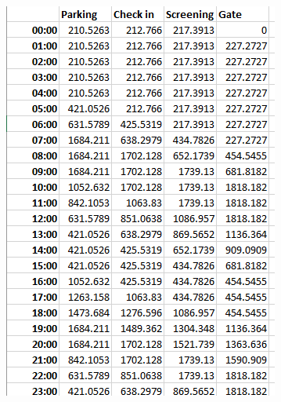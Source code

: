 \documentclass[10pt]{extarticle}
\newcommand{\<}{\langle}
\renewcommand{\>}{\rangle}
\theoremstyle{mystyle}{\newtheorem*{remark}{Remark}}
\theoremstyle{mystyle}{\newtheorem*{remarks}{Remarks}}
\theoremstyle{mystyle}{\newtheorem*{example}{Example}}
\theoremstyle{mystyle}{\newtheorem*{examples}{Examples}}
\theoremstyle{definition}{\newtheorem*{exercise}{Exercise}}
\theoremstyle{warn}
\begin{document}
\begin{figure}[htbp]
  \centering
  \begin{minipage}[b]{0.3\textwidth}
    \centering
    \includegraphics[width=\textwidth]{figures/visualizations/01table.png}
  \end{minipage}
  \hfill
  \begin{minipage}[b]{0.3\textwidth}
    \centering

\end{minipage}
\end{figure}
\end{document}
